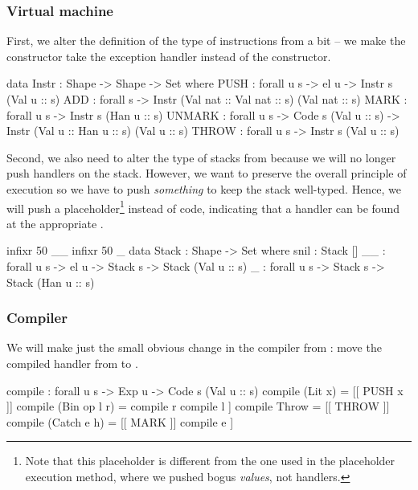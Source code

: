 \subsubsection{Virtual machine}

First, we alter the definition of the type of instructions from
 a bit -- we make the  constructor take
the exception handler instead of the  constructor.

\begin{code}
  data Instr : Shape -> Shape -> Set where
    PUSH : forall {u s} -> el u -> Instr s (Val u :: s)
    ADD : forall {s} -> Instr (Val nat :: Val nat :: s) (Val nat :: s)
    MARK : forall {u s} -> Instr s (Han u :: s)
    UNMARK : forall {u s} -> Code s (Val u :: s) -> Instr (Val u :: Han u :: s) (Val u :: s)
    THROW : forall {u s} -> Instr s (Val u :: s)
\end{code}

Second, we also need to alter the type of stacks from 
because we will no longer push handlers on the stack. However, we want to
preserve the overall principle of execution so we have to push \emph{something}
to keep the stack well-typed.  Hence, we will push a placeholder\footnote{ Note
that this placeholder is different from the one used in the placeholder
execution method, where we pushed bogus \emph{values}, not handlers.} instead
of code, indicating that a handler can be found at the appropriate
.

\begin{code}
  infixr 50 _\scons\_
  infixr 50 \void\sconsh\_
  data Stack : Shape -> Set where
    snil : Stack []
    _\scons\_ : forall {u s} -> el u -> Stack s -> Stack (Val u :: s)
    \void\sconsh\_ : forall {u s} -> Stack s -> Stack (Han u :: s)
\end{code}

\subsubsection{Compiler}

We will make just the small obvious change in the compiler from
: move the compiled handler from  to .

\label{sec:hau-compile}\begin{code}
compile : forall {u s} -> Exp u -> Code s (Val u :: s)
compile (Lit x) = [[ PUSH x ]]
compile (Bin op l r) = compile r \app compile l \app [[ opInstr op ]] 
compile Throw = [[ THROW ]]
compile (Catch e h) = [[ MARK ]] \app compile e \app [[ UNMARK (compile h) ]]
\end{code}

